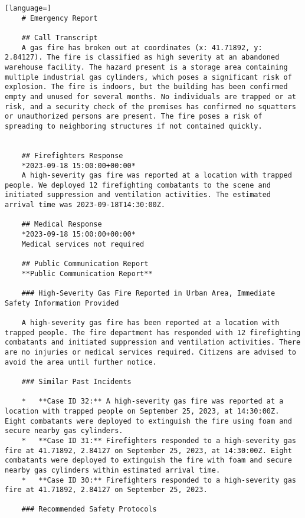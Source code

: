 \begin{lstlisting}[language=]
    # Emergency Report

    ## Call Transcript
    A gas fire has broken out at coordinates (x: 41.71892, y: 2.84127). The fire is classified as high severity at an abandoned warehouse facility. The hazard present is a storage area containing multiple industrial gas cylinders, which poses a significant risk of explosion. The fire is indoors, but the building has been confirmed empty and unused for several months. No individuals are trapped or at risk, and a security check of the premises has confirmed no squatters or unauthorized persons are present. The fire poses a risk of spreading to neighboring structures if not contained quickly.


    ## Firefighters Response
    *2023-09-18 15:00:00+00:00*
    A high-severity gas fire was reported at a location with trapped people. We deployed 12 firefighting combatants to the scene and initiated suppression and ventilation activities. The estimated arrival time was 2023-09-18T14:30:00Z.

    ## Medical Response
    *2023-09-18 15:00:00+00:00*
    Medical services not required

    ## Public Communication Report
    **Public Communication Report**

    ### High-Severity Gas Fire Reported in Urban Area, Immediate Safety Information Provided

    A high-severity gas fire has been reported at a location with trapped people. The fire department has responded with 12 firefighting combatants and initiated suppression and ventilation activities. There are no injuries or medical services required. Citizens are advised to avoid the area until further notice.

    ### Similar Past Incidents

    *   **Case ID 32:** A high-severity gas fire was reported at a location with trapped people on September 25, 2023, at 14:30:00Z. Eight combatants were deployed to extinguish the fire using foam and secure nearby gas cylinders.
    *   **Case ID 31:** Firefighters responded to a high-severity gas fire at 41.71892, 2.84127 on September 25, 2023, at 14:30:00Z. Eight combatants were deployed to extinguish the fire with foam and secure nearby gas cylinders within estimated arrival time.
    *   **Case ID 30:** Firefighters responded to a high-severity gas fire at 41.71892, 2.84127 on September 25, 2023.

    ### Recommended Safety Protocols


\end{lstlisting}
